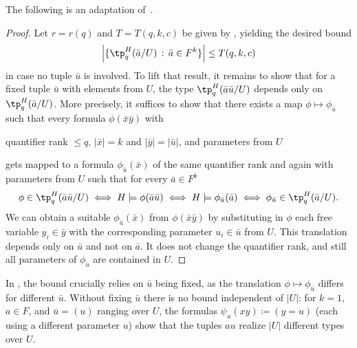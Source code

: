 The following is an adaptation of~\cite[Corollary~16]{number-of-types}.
\septypestuples*
\begin{proof}
  Let $r=r(q)$ and $T=T(q,k,c)$ be given by ,
  yielding the desired bound
  \[
  \left|
    \{
    \tp_q^H(\bar a/U) \,:\, \bar a \in F^k
    \}
  \right|
  \leq
  T(q,k,c)
  \]
  in case no tuple $\bar u$ is involved.
  To lift that result, it remains to show that for a fixed tuple $\bar u$ with elements from $U$, the type
  $\tp^H_q(\bar a\bar u/U)$ depends only on $\tp^H_q(\bar a/U)$.
  More precisely, it suffices to show that there exists a map $\phi \mapsto \phi_{\bar u}$ such that every formula
  $\phi(\bar x \bar y)$ with

  \begin{center}
    quantifier rank ${\leq}q$,
    \qquad
    $|\bar x| = k$ and $|\bar y| = |\bar u|$,
    \qquad
    and parameters from $U$
  \end{center}
  gets mapped to a formula $\phi_{\bar u}(\bar x)$ of the same quantifier rank and again with parameters from $U$ such that
  for every $\bar a \in F^k$
  \[
    \phi\in\tp^H_q(\bar a\bar u/U)
    \iff H\models\phi(\bar a\bar u)
    \iff H\models\phi_{\bar u}(\bar a)
    \iff \phi_{\bar u}\in\tp^H_q(\bar a/U).
  \]
  We can obtain a suitable $\phi_{\bar u}(\bar x)$ from $\phi(\bar x \bar y)$ by substituting in $\phi$ each free variable $y_i \in \bar y$ with the corresponding parameter $u_i \in \bar u$ from $U$.
  This translation depends only on $\bar u$ and not on $\bar a$.
  It does not change the quantifier rank, and still all parameters of $\phi_{\bar u}$ are contained in $U$.
\end{proof}
\begin{remark}
  In ,
  the bound crucially relies on $\bar u$ being fixed, as the translation $\phi\mapsto\phi_{\bar u}$ differs for different $\bar u$.
  Without fixing $\bar u$ there is no bound independent of $|U|$:
  for $k=1$, $a\in F$, and $\bar u=(u)$ ranging over $U$, the formulas $\psi_u(xy) \coloneqq (y=u)$ (each using a different parameter $u$) show that the tuples $au$ realize $|U|$ different types over $U$.
\end{remark}

